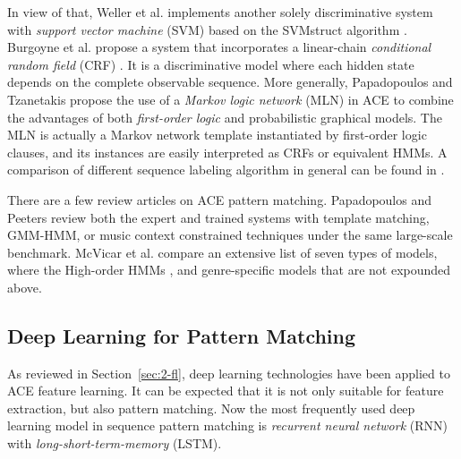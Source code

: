 In view of that, Weller et al. \cite{weller2009structured} implements another solely discriminative system \cite{weller2009structured} with {\it support vector machine} (SVM) \cite{cortes1995support} based on the SVMstruct algorithm \cite{tsochantaridis2005large}. Burgoyne et al. propose a system \cite{burgoyne2007cross} that incorporates a linear-chain {\it conditional random field} (CRF) \cite{lafferty2001conditional}. It is a discriminative model where each hidden state depends on the complete observable sequence. More generally, Papadopoulos and Tzanetakis \cite{papadopoulos2012modeling} propose the use of a {\it Markov logic network} (MLN) \cite{richardson2006markov} in ACE to combine the advantages of both {\it first-order logic} and probabilistic graphical models. The MLN is actually a Markov network template instantiated by first-order logic clauses, and its instances are easily interpreted as CRFs or equivalent HMMs. A comparison of different sequence labeling algorithm in general can be found in \cite{nguyen2007comparisons}.

There are a few review articles on ACE pattern matching. Papadopoulos and Peeters \cite{papadopoulos2007large} review both the expert and trained systems with template matching, GMM-HMM, or music context constrained techniques under the same large-scale benchmark. McVicar et al. \cite{mcvicar2014automatic} compare an extensive list of seven types of models, where the High-order HMMs \cite{scholz2009robust,mauch2007discovering,khadkevich2009use,yoshii2011vocabulary}, and genre-specific models \cite{lee2008acoustic,lee2007system} that are not expounded above.

\subsection{Deep Learning for Pattern Matching} \label{sec:2-rnnpm}
As reviewed in Section~\ref{sec:2-fl}, deep learning technologies have been applied to ACE feature learning. It can be expected that it is not only suitable for feature extraction, but also pattern matching. Now the most frequently used deep learning model in sequence pattern matching is {\it recurrent neural network} (RNN) with {\it long-short-term-memory} (LSTM).

